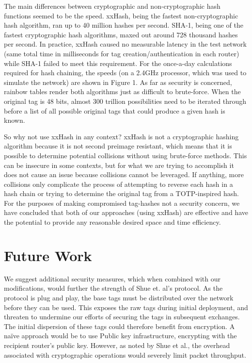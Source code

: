 \documentclass[12pt]{article} %
\begin{document}
The main differences between cryptographic and non-cryptographic hash functions seemed to be the speed. xxHash, being the fastest non-cryptographic hash algorithm, ran up to 40 million hashes per second. SHA-1, being one of the fastest cryptographic hash algorithms, maxed out around 728 thousand hashes per second. In practice, xxHash caused no measurable latency in the test network (same total time in milliseconds for tag creation/authentication in each router) while SHA-1 failed to meet this requirement. For the once-a-day calculations required for hash chaining, the speeds (on a 2.4GHz processor, which was used to simulate the network) are shown in Figure 1. As far as security is concerned, rainbow tables render both algorithms just as difficult to brute-force. When the original tag is 48 bits, almost 300 trillion possibilities need to be iterated through before a list of all possible original tags that could produce a given hash is known.

So why not use xxHash in any context? xxHash is not a cryptographic hashing algorithm because it is not second preimage resistant, which means that it is possible to determine potential collisions without using brute-force methods. This can be insecure in some contexts, but for what we are trying to accomplish it does not cause an issue because collisions cannot be leveraged. If anything, more collisions only complicate the process of attempting to reverse each hash in a hash chain or trying to determine the original tag from a TOTP-inspired hash. For the purposes of making compromised tag-hashes not a security concern, we have concluded that both of our approaches (using xxHash) are effective and have the potential to provide any reasonable desired space and time efficiency.

\section{Future Work}

We suggest additional security measures, which when combined with our modifications, would further the strength of Shue et. al's protocol. As the protocol is plug and play, the base tags must be distributed over the network before they can be used. This exposes the raw tags during initial deployment, and threaten to undermine our efforts of securing the tags in subsequent exchanges. The initial dispersion of these tags could therefore benefit from encryption. A na\"{i}ve approach would be to use Public key infrastructure, encrypting with the recipient router's public key. However, as noted by Shue et al., the overhead associated with cryptographic operations would severely limit packet throughput. 
\end{document}
